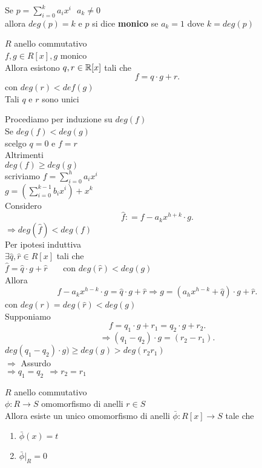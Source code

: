 \documentclass[12px]{article}
\begin{document}
Se $p = \sum^{k}_{i=0}a_ix^i \ \ \ a_k\neq 0$\\
allora $deg(p) = k$ e  $p$ si dice  \textbf{monico} se $a_k = 1$ dove $k = deg(p)$\\
\begin{teo}
	$R$ anello commutativo\\
	$f,g\in R[x], g$ monico\\
	Allora esistono $q,r\in\mathbb{R}[x]$ tali che 
	 \[
	f = q\cdot g + r
	.\] 
	con $deg(r) < def(g)$\\
	Tali $q$ e $r$ sono unici
\end{teo}
\begin{dimo}
	Procediamo per induzione su $deg(f)$\\
	Se  $deg(f) < deg (g)$\\
	scelgo  $q = 0$ e $f = r$\\
	Altrimenti  \\
	$deg(f) \geq deg(g)$\\
	scriviamo $f = \sum^{h}_{i=0  }a_ix^i$\\
	$g =  \left( \sum^{k-1}_{i=0}b_ix^i \right) + x^k$\\
	Considero\\
	\[
		\hat f : = f - a_kx^{h + k}\cdot g
	.\] 
	$ \Rightarrow deg(\hat f) < deg (f)$\\
	Per ipotesi induttiva\\
	$\exists \hat q, \hat r\in R[x]$ tali che\\
	$\hat f = \hat q \cdot g + \hat r$ \ \ \ con  $deg(\hat r) < deg(g)$\\
	Allora\\
	\[
		f  - a_kx^{h-k}\cdot g = \hat q\cdot g + \hat r \Rightarrow g = (a_hx^{h-k} + \hat q)\cdot g + \hat r
	.\] 
	con $deg(r) = deg(\hat r) < deg(g)$\\
	Supponiamo\\
	 \[
	f = q_1\cdot g + r_1 = q_2\cdot g + r_2
	.\] 
	\[
	\Rightarrow  (q_1-q_2)\cdot g = (r_2-r_1)
	.\] 
	$deg(q_1-q_2)\cdot g) \geq deg(g) > deg(r_2r_1)$\\
	$ \Rightarrow $ Assurdo\\
	$ \Rightarrow q_1=q_2 \ \ \Rightarrow r_2= r_1$
\end{dimo}
\begin{teo}
	$R$ anello commutativo\\
	$\phi: R \rightarrow S$ omomorfismo di anelli $r\in S$\\
	Allora esiste un unico omomorfismo di anelli  $\bar \phi: R[x] \rightarrow S$ tale che
\begin{enumerate}
	\item $\bar\phi(x) = t$\\
	\item $\bar\phi|_R = 0$
\end{enumerate}
\end{teo}
\end{document}
